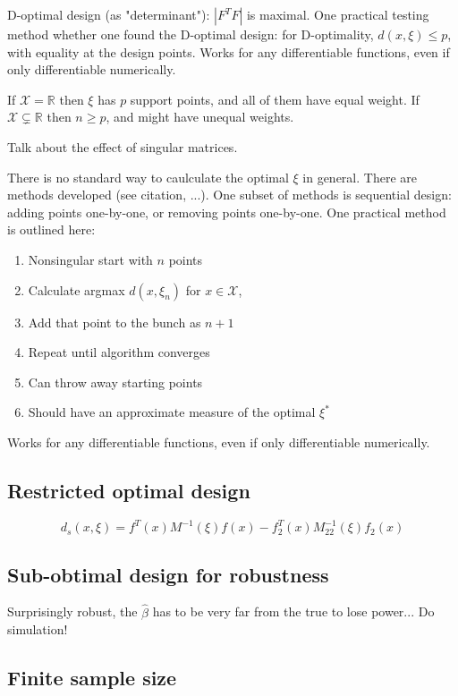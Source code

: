 \documentclass[12pt]{iopart}
\begin{document}
D-optimal design (as "determinant"): $|F^T F|$ is maximal.
One practical testing method whether one found the D-optimal design: for D-optimality, $d(x, \xi) \leq p$, with equality at the design points.
Works for any differentiable functions, even if only differentiable numerically.

If $\mathcal{X} = \mathbb{R}$ then $\xi$ has $p$ support points, and all of them have equal weight. If $\mathcal{X} \subsetneq \mathbb{R}$ then $n \geq p$, and might have unequal weights.

Talk about the effect of singular matrices.

There is no standard way to caulculate the optimal $\xi$ in general. There are methods developed (see citation, ...). One subset of methods is sequential design: adding points one-by-one, or removing points one-by-one. One practical method is outlined here:

\begin{enumerate}
\item Nonsingular start with $n$ points
\item Calculate argmax $d(x, \xi_n)$ for $x \in \mathcal{X}$,
\item Add that point to the bunch as $n+1$
\item Repeat until algorithm converges
\item Can throw away starting points
\item Should have an approximate measure of the optimal $\xi^*$
\end{enumerate}
Works for any differentiable functions, even if only differentiable numerically.

\subsection{Restricted optimal design}

\begin{equation}
d_s(x, \xi) = f^T(x) M^{-1}(\xi)f(x) - f_2^T(x) M_{22}^{-1}(\xi)f_2(x)
\label{eq:dsvar}
\end{equation}

\subsection{Sub-obtimal design for robustness}

Surprisingly robust, the $\hat \beta$ has to be very far from the true to lose power... Do simulation!

\subsection{Finite sample size}
\end{document}
